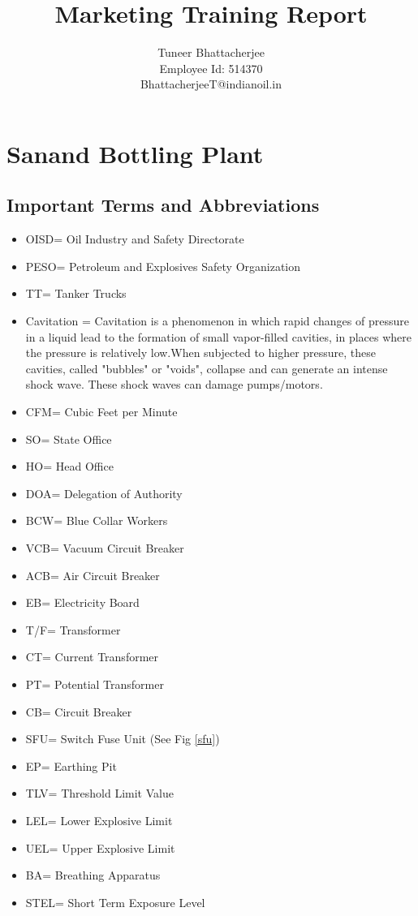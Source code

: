\documentclass{report}
\title{Marketing Training Report}
\author{Tuneer Bhattacherjee\\Employee Id: 514370\\BhattacherjeeT@indianoil.in}
\begin{document}
	\maketitle
	\pagebreak
	\tableofcontents
	\pagebreak
	\chapter{Sanand Bottling Plant}
	\section{Important Terms and Abbreviations}
	\begin{itemize}
		\item OISD= Oil Industry and Safety Directorate
		\item PESO= Petroleum and Explosives Safety Organization
		\item TT= Tanker Trucks
		\item Cavitation = Cavitation is a phenomenon in which rapid changes of pressure in a liquid lead to the formation of small vapor-filled cavities, in places where the pressure is relatively low.When subjected to higher pressure, these cavities, called "bubbles" or "voids", collapse and can generate an intense shock wave. These shock waves can damage pumps/motors.
		\item CFM= Cubic Feet per Minute
		\item SO= State Office
		\item HO= Head Office
		\item DOA= Delegation of Authority
		\item BCW= Blue Collar Workers
		\item VCB= Vacuum Circuit Breaker
		\item ACB= Air Circuit Breaker
		\item EB= Electricity Board
		\item T/F= Transformer
		\item CT= Current Transformer
		\item PT= Potential Transformer
		\item CB= Circuit Breaker
		\item SFU= Switch Fuse Unit (See Fig \ref{sfu})
		\item EP= Earthing Pit
		\item TLV= Threshold Limit Value
		\item LEL= Lower Explosive Limit
		\item UEL= Upper Explosive Limit
		\item BA= Breathing Apparatus
		\item STEL= Short Term Exposure Level
	\end{itemize}
\end{document}
